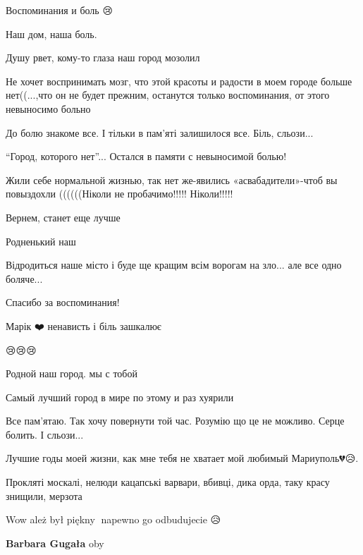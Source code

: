 
Воспоминания и боль 😢


Наш дом, наша боль.


Душу рвет, кому-то глаза наш город мозолил🤔


Не хочет воспринимать мозг, что этой красоты и радости в моем городе больше
нет((...,что он не будет прежним, останутся только воспоминания, от этого
невыносимо больно


До болю знакоме все. І тільки в пам'яті залишилося все. Біль, сльози...


\enquote{Город, которого нет}... Остался в памяти с невыносимой болью!


Жили себе нормальной жизнью, так нет же-явились «асвабадители»-чтоб вы
повыздохли ((((((Ніколи не пробачимо!!!!! Ніколи!!!!!


Вернем, станет еще лучше


Родненький наш


Відродиться наше місто і буде ще кращим всім ворогам на зло... але все одно
боляче...


Спасибо за воспоминания!💖💖💖


Марік ❤️ ненависть і біль зашкалює

😢😢😢


Родной наш город. мы с тобой


Самый лучший город в мире по этому и раз хуярили


Все пам'ятаю. Так хочу повернути той час. Розумію що це не можливо. Серце болить. І сльози...


Лучшие годы моей жизни, как мне тебя не хватает мой любимый Мариуполь💔😥.


Прокляті москалі, нелюди кацапські варвари, вбивці, дика орда, таку красу знищили, мерзота


Wow ależ był piękny🤩 napewno go odbudujecie 😥👍🏻

\begin{itemize} %
\textbf{Barbara Gugała} oby
\end{itemize} %


